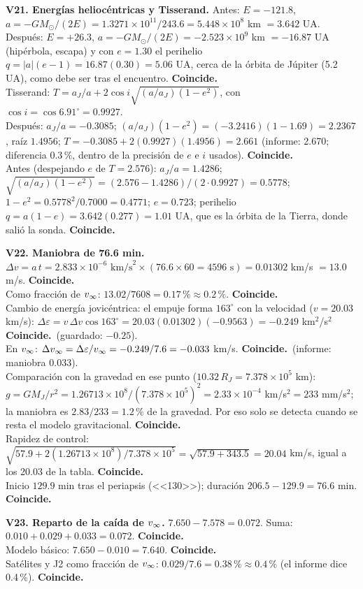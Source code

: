 \documentclass[11pt,letterpaper]{article}
\newcommand{\ok}{\textbf{Coincide.}\ }
\begin{document}
\textbf{V21. Energías heliocéntricas y Tisserand.} Antes: $E=-121.8$, $a=-GM_\odot/(2E)=1.3271\times10^{11}/243.6=5.448\times10^8$ km $=3.642$ UA. Después: $E=+26.3$, $a=-GM_\odot/(2E)=-2.523\times10^9$ km $=-16.87$ UA (hipérbola, escapa) y con $e=1.30$ el perihelio $q=|a|(e-1)=16.87(0.30)=5.06$ UA, cerca de la órbita de Júpiter (5.2 UA), como debe ser tras el encuentro. \ok\\
Tisserand: $T=a_J/a+2\cos i\sqrt{(a/a_J)(1-e^2)}$, con $\cos i=\cos6.91^\circ=0.9927$.\\
Después: $a_J/a=-0.3085$; $(a/a_J)(1-e^2)=(-3.2416)(1-1.69)=2.2367$, raíz $1.4956$; $T=-0.3085+2(0.9927)(1.4956)=2.661$ (informe: 2.670; diferencia $0.3\,\%$, dentro de la precisión de $e$ e $i$ usados). \ok\\
Antes (despejando $e$ de $T=2.576$): $a_J/a=1.4286$; $\sqrt{(a/a_J)(1-e^2)}=(2.576-1.4286)/(2\cdot0.9927)=0.5778$; $1-e^2=0.5778^2/0.7000=0.4771$; $e=0.723$; perihelio $q=a(1-e)=3.642(0.277)=1.01$ UA, que es la órbita de la Tierra, donde salió la sonda. \ok

\textbf{V22. Maniobra de 76.6 min.} $\Delta v=a\,t=2.833\times10^{-6}\text{ km/s}^2\times(76.6\times60=4596\text{ s})=0.01302$ km/s $=13.0$ m/s. \ok\\
Como fracción de $v_\infty$: $13.02/7608=0.17\,\%\approx0.2\,\%$. \ok\\
Cambio de energía jovicéntrica: el empuje forma $163^\circ$ con la velocidad ($v=20.03$ km/s): $\Delta\varepsilon=v\,\Delta v\cos163^\circ=20.03(0.01302)(-0.9563)=-0.249$ km$^2$/s$^2$ \ok (guardado: $-0.25$).\\
En $v_\infty$: $\Delta v_\infty=\Delta\varepsilon/v_\infty=-0.249/7.6=-0.033$ km/s. \ok (informe: maniobra 0.033).\\
Comparación con la gravedad en ese punto ($10.32\,R_J=7.378\times10^5$ km): $g=GM_J/r^2=1.26713\times10^8/(7.378\times10^5)^2=2.33\times10^{-4}$ km/s$^2=233$ mm/s$^2$; la maniobra es $2.83/233=1.2\,\%$ de la gravedad. Por eso solo se detecta cuando se resta el modelo gravitacional. \ok\\
Rapidez de control: $\sqrt{57.9+2(1.26713\times10^8)/7.378\times10^5}=\sqrt{57.9+343.5}=20.04$ km/s, igual a los 20.03 de la tabla. \ok\\
Inicio $129.9$ min tras el periapsis (<<130>>); duración $206.5-129.9=76.6$ min. \ok

\textbf{V23. Reparto de la caída de $v_\infty$.} $7.650-7.578=0.072$. Suma: $0.010+0.029+0.033=0.072$. \ok\\
Modelo básico: $7.650-0.010=7.640$. \ok\\
Satélites y J2 como fracción de $v_\infty$: $0.029/7.6=0.38\,\%\approx0.4\,\%$ (el informe dice 0.4\,\%). \ok
\end{document}
